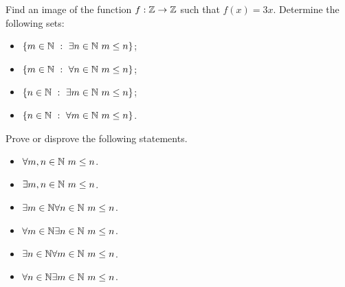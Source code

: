 \begin{chapterendexercises}
  \exercise Find an image of the function $f : \mathbb{Z} \to \mathbb{Z}$ such that
    $f(x) = 3x$.
  \exercise Determine the following sets:
    \begin{itemize}
      \item $\set[\exists n \in \N \ m \le n]{m \in \N}$;
      \item $\set[\forall n \in \N \ m \le n]{m \in \N}$;
      \item $\set[\exists m \in \N \ m \le n]{n \in \N}$;
      \item $\set[\forall m \in \N \ m \le n]{n \in \N}$.
    \end{itemize}
  \exercise Prove or disprove the following statements.
    \begin{itemize}
      \item $\forall m, n \in \mathbb{N} \ m \le n$.
      \item $\exists m, n \in \mathbb{N} \ m \le n$.
      \item $\exists m \in \mathbb{N} \forall n \in \mathbb{N} \ m \le n$.
      \item $\forall m \in \mathbb{N} \exists n \in \mathbb{N} \ m \le n$.
      \item $\exists n \in \mathbb{N} \forall m \in \mathbb{N} \ m \le n$.
      \item $\forall n \in \mathbb{N} \exists m \in \mathbb{N} \ m \le n$.
    \end{itemize}
\end{chapterendexercises}
